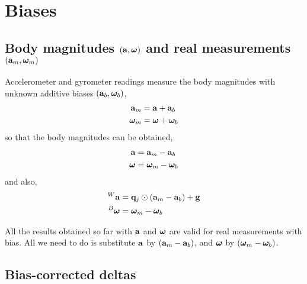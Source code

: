 \newpage
\section{Biases}

\subsection{Body magnitudes $({\bf a},{{\bm \omega}})$ and real measurements $({\bf a}_m,{{\bm \omega}}_m)$}

Accelerometer and gyrometer readings measure the body magnitudes with unknown additive biases $({{\bf a}_b},{{{\bm \omega}}_b})$,
%
\begin{align}
\begin{split}
{\bf a}_m &= {\bf a} + {{\bf a}_b} \\
{{\bm \omega}}_m &= {{\bm \omega}} + {{{\bm \omega}}_b}
\end{split}
\end{align}
%
so that the body magnitudes can be obtained,
%
\begin{align}
\begin{split}
{\bf a} &= {\bf a}_m - {{\bf a}_b} \\
{{\bm \omega}} &= {{\bm \omega}}_m - {{{\bm \omega}}_b}
\end{split}
\end{align}
%
and also,
%
\begin{align*}
{}^W{\bf a} &= {\bf q}_j\odot({\bf a}_m-{{\bf a}_b}) + {\bf g} \\
{}^B{{\bm \omega}} &= {{\bm \omega}}_m-{{{\bm \omega}}_b}
\end{align*}

All the results obtained so far with ${\bf a}$ and ${{\bm \omega}}$ are valid for real measurements with bias. All we need to do is substitute ${\bf a}$ by $({\bf a}_m-{{\bf a}_b})$, and ${{\bm \omega}}$ by $({{\bm \omega}}_m-{{{\bm \omega}}_b})$.


\subsection{Bias-corrected deltas}

